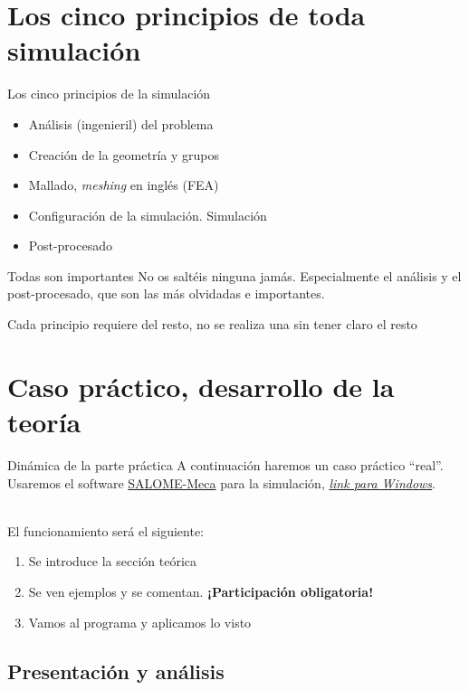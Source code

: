 \documentclass[12pt]{beamer}
\begin{document}
\section{Los cinco principios de toda simulación}

\begin{frame}{Los cinco principios de la simulación}
	\begin{itemize}
		\item Análisis (ingenieril) del problema
		\item Creación de la geometría y grupos
		\item Mallado, \textit{meshing} en inglés (FEA)
		\item Configuración de la simulación. Simulación
		\item Post-procesado
	\end{itemize} \pause
	\begin{block}{Todas son importantes}
		No os saltéis ninguna jamás. Especialmente el análisis y el post-procesado, que son las más olvidadas e importantes.
	\end{block}
	Cada principio requiere del resto, no se realiza una sin tener claro el resto
\end{frame}

\section{Caso práctico, desarrollo de la teoría}

\begin{frame}{Dinámica de la parte práctica}
	A continuación haremos un caso práctico ``real''. Usaremos el software \href{https://code-aster.org/spip.php?article303}{SALOME-Meca} para la simulación, \href{https://code-aster-windows.com/download/}{\textit{link para Windows}}. \\~
	
	El funcionamiento será el siguiente:
	\begin{enumerate}
		\item Se introduce la sección teórica
		\item Se ven ejemplos y se comentan. \textbf{¡Participación obligatoria!}
		\item Vamos al programa y aplicamos lo visto
	\end{enumerate}
\end{frame}

\subsection{Presentación y análisis}
\end{document}
